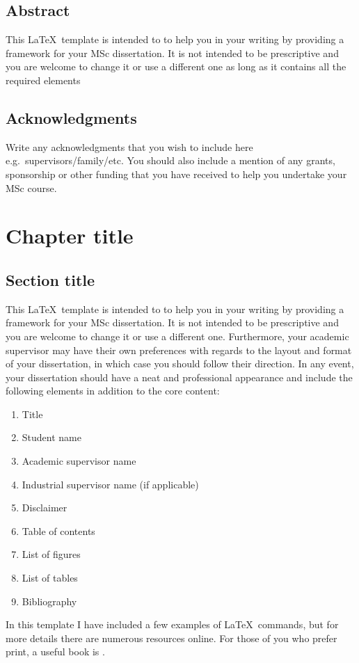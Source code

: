 \documentclass[11pt,a4paper,oneside]{book}
\begin{document}
\section*{Abstract}
This \LaTeX\ template is intended to to help you in your writing by providing a framework for your MSc dissertation. It is not intended to be prescriptive and you are welcome to change it or use a different one as long as it contains all the required elements
\newpage 
\section*{Acknowledgments}
Write any acknowledgments that you wish to include here e.g.~supervisors/family/etc. You should also include a mention of any grants, sponsorship or other funding that you have received to help you undertake your MSc course.
\newpage
\setcounter{tocdepth}{2} 
\cleardoublepage
\tableofcontents
\cleardoublepage
\listoffigures
\cleardoublepage
\listoftables

\mainmatter
\chapter{Chapter title}
\section{Section title}\label{sec:1_example1}
This \LaTeX\ template is intended to to help you in your writing by providing a framework for your MSc dissertation. It is not intended to be prescriptive and you are welcome to change it or use a different one. Furthermore, your academic supervisor may have their own preferences with regards to the layout and format of your dissertation, in which case you should follow their direction. In any event, your dissertation should have a neat and professional appearance and include the following elements in addition to the core content:
\begin{enumerate}
\item Title
\item Student name
\item Academic supervisor name
\item Industrial supervisor name (if applicable)
\item Disclaimer
\item Table of contents
\item List of figures
\item List of tables
\item Bibliography
\end{enumerate}
In this template I have included a few examples of \LaTeX\ commands, but for more details there are numerous resources online. For those of you who prefer print, a useful book is \cite{Lamport1994}.
\end{document}
